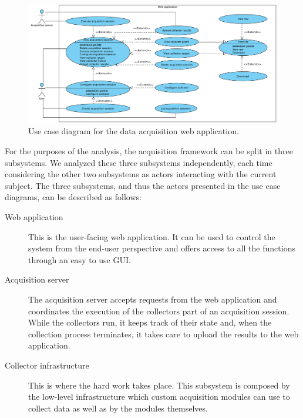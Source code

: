\begin{figure}[p]
  \begin{adjustwidth}{-2.2cm}{-1.5cm}
  \includegraphics[width=\linewidth]{images/diagrams/uc-acquisition}
  \end{adjustwidth}

  \caption[Use case diagram for the data acquisition web application.]{Use case diagram for the data acquisition web application.}
  \label{fig:uc-acquisition}
\end{figure}

For the purposes of the analysis, the acquisition framework can be split in three subsystems. We analyzed these three subsystems independently, each time considering the other two subsystems as actors interacting with the current subject. The three subsystems, and thus the actors presented in the use case diagrams, can be described as follows:

\begin{description}
  \item[Web application] This is the user-facing web application. It can be used to control the system from the end-user perspective and offers access to all the functions through an easy to use GUI.
  \item[Acquisition server] The acquisition server accepts requests from the web application and coordinates the execution of the collectors part of an acquisition session. While the collectors run, it keeps track of their state and, when the collection process terminates, it takes care to upload the results to the web application.
  \item[Collector infrastructure] This is where the hard work takes place. This subsystem is composed by the low-level infrastructure which custom acquisition modules can use to collect data as well as by the modules themselves.
\end{description}

